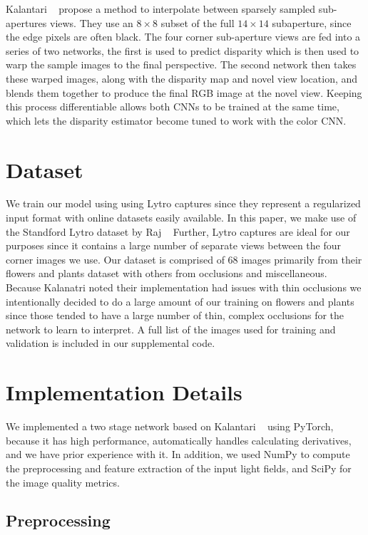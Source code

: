 \documentclass[10pt,twocolumn,letterpaper]{article}
\begin{document}
Kalantari \etal~\cite{LearningViewSynthesis} propose a method to interpolate between 
sparsely sampled sub-apertures views. They use an $8 \times 8$ subset of the full $14 \times 14$ subaperture, since the
edge pixels are often black. The four corner sub-aperture views are fed into a series of two 
networks, the first is used to predict disparity which is then used to warp the sample images to the final perspective.
The second network then takes these warped images, along with the disparity map and novel view location, and blends them together
to produce the final RGB image at the novel view. Keeping this process differentiable allows both CNNs to 
be trained at the same time, which lets the disparity estimator become tuned to work with the color CNN.

\section{Dataset}

We train our model using using Lytro captures since they represent a regularized input format with
online datasets easily available. In this paper, we make use of the Standford Lytro dataset by Raj \etal~\cite{StanfordLytro}
Further, Lytro captures are ideal for our purposes since it contains a large number of separate views between the
four corner images we use. Our dataset is comprised of 68 images primarily from their flowers and plants dataset with
others from occlusions and miscellaneous. Because Kalanatri \etal noted their implementation had issues with thin occlusions
we intentionally decided to do a large amount of our training on flowers and plants since those tended to have a large number
of thin, complex occlusions for the network to learn to interpret. A full list of the images used for training and
validation is included in our supplemental code.

\section{Implementation Details}

We implemented a two stage network based on Kalantari \etal~\cite{LearningViewSynthesis} using PyTorch, because it has high performance,
automatically handles calculating derivatives, and we have prior experience with it.
In addition, we used NumPy to compute the preprocessing and feature extraction of the input light fields,
and SciPy for the image quality metrics.

\subsection{Preprocessing}
\end{document}
